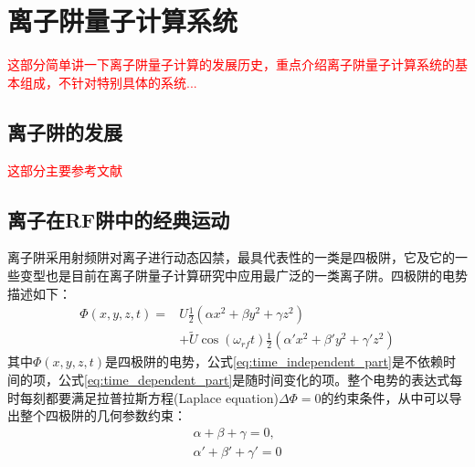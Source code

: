 
\chapter[离子阱量子计算系统]{离子阱量子计算系统}

\textcolor{red}{
这部分简单讲一下离子阱量子计算的发展历史，重点介绍离子阱量子计算系统的基本组成，不针对特别具体的系统...
}

\section[离子阱的发展]{离子阱的发展}

\textcolor{red}{这部分主要参考文献\cite[p2]{Bruzewicz_Chiaverini_McConnell_Sage_2019}}





\section[离子在RF阱中的经典运动]{离子在RF阱中的经典运动\label{section:ion_classical_motion}}

离子阱采用射频阱对离子进行动态囚禁，最具代表性的一类是四极阱，它及它的一些变型也是目前在离子阱量子计算研究中应用最广泛的一类离子阱。四极阱的电势描述如下：
\begin{align}
    \Phi(x, y, z, t) = &U\frac{1}{2}(\alpha x^2 + \beta y^2 + \gamma z^2) \label{eq:time_independent_part}\\
    \label{eq:time_dependent_part}
    &+ \tilde{U}\cos (\omega_{rf}t)\frac{1}{2}(\alpha ' x^2 + \beta ' y^2 + \gamma ' z^2) 
\end{align}
其中$\Phi(x, y, z, t)$是四极阱的电势，公式\eqref{eq:time_independent_part}是不依赖时间的项，公式\eqref{eq:time_dependent_part}是随时间变化的项。整个电势的表达式每时每刻都要满足拉普拉斯方程(Laplace equation)$\Delta \Phi=0$的约束条件，从中可以导出整个四极阱的几何参数约束：
\begin{align}
    \alpha + \beta + \gamma =0,\\
    \alpha ' + \beta ' + \gamma ' =0
\end{align}

